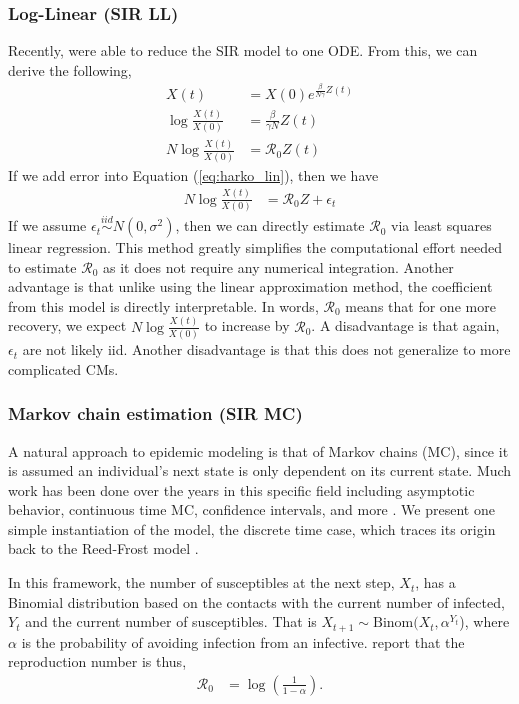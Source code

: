\documentclass[12pt]{article}
\newcommand{\rr}{\ensuremath{\mathcal{R}_0}}
\begin{document}
\subsubsection{Log-Linear (SIR LL)}
Recently, \cite{harko2014exact} were able to reduce the SIR model to one ODE.  From this, we can derive the following,
\begin{align}
  X(t) &=  X(0) e^{\frac{\beta}{N \gamma}Z(t)} \nonumber\\
  \log \frac{X(t)}{X(0)} &=  \frac{\beta }{\gamma N }Z(t) \nonumber\\
  N\log \frac{X(t)}{X(0)} &=  \rr Z(t) \label{eq:harko_lin}
\end{align}
If we add error into Equation (\ref{eq:harko_lin}), then we have
\begin{align}
N  \log \frac{X(t)}{X(0)} &=  \rr Z  + \epsilon_t\label{eq:r0_harko}
\end{align}
If we assume $\epsilon_t \overset{iid}{\sim}N(0, \sigma^2)$, then we can directly estimate $\rr$ via least squares linear regression.  This method greatly simplifies the computational effort needed to estimate $\rr$ as it does not require any numerical integration.  Another advantage is that unlike using the linear approximation method, the coefficient from this model is directly interpretable.  In words, $\rr$ means that for one more recovery, we expect $N \log \frac{X(t)}{X(0)}$ to increase by $\rr$.  A disadvantage is that again, $\epsilon_t$ are not likely iid.  Another disadvantage is that this does not generalize to more complicated CMs.

\subsubsection{Markov chain estimation (SIR MC)}
A natural approach to epidemic modeling is that of Markov chains (MC), since it is assumed an individual's next state is only dependent on its current state.  Much work has been done over the years in this specific field including asymptotic behavior, continuous time MC, confidence intervals, and more \citep{jacquez1991,gani1995,daley2001epidemic}.  We present one simple instantiation of the model, the discrete time case, which traces its origin back to the Reed-Frost model \citep{abbey1952}.

In this framework, the number of susceptibles at the next step, $X_{t}$, has a Binomial distribution based on the contacts with the current number of infected, $Y_{t}$ and the current number of susceptibles.  That is $X_{t+1} \sim \text{Binom}(X_t, \alpha^{Y_t}$), where $\alpha$ is the probability of avoiding infection from an infective.  \cite{barbour2004} report that the reproduction number is thus,
\begin{align}\label{eq:r0-mc}
\rr &= \log \left ( \frac{1}{1-\alpha}\right ).
\end{align}
\end{document}
